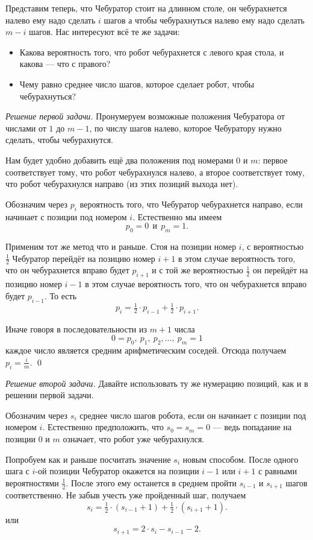 \documentclass{article}
\begin{document}
Представим теперь, что Чебуратор стоит на длинном столе,
он чебурахнется налево ему надо сделать $i$ шагов
а чтобы чебурахнуться налево ему надо сделать $m-i$ шагов.
Нас интересуют всё те же задачи:

\begin{itemize}
\item Какова вероятность того, что робот чебурахнется с левого края стола, и какова --- что с правого?
\item Чему равно среднее число шагов, которое сделает робот, чтобы чебурахнуться?
\end{itemize}

\medskip
\noindent\textit{Решение первой задачи.}
Пронумеруем возможные положения Чебуратора от числами от $1$ до $m-1$,
по числу шагов налево, которое Чебуратору нужно сделать, чтобы чебурахнутся.

Нам будет удобно добавить ещё два положения под номерами $0$ и $m$:
первое соответствует тому, что робот чебурахнулся налево, 
а второе соответствует тому, что робот чебурахнулся направо
(из этих позиций выхода нет).


Обозначим через $p_i$ вероятность того, 
что Чебуратор чебурахнется направо,
если начинает с позиции под номером $i$.
Естественно мы имеем 
\[p_0=0\ \  \text{и}\ \  p_{m}=1.\]

Применим тот же метод что и раньше.
Стоя на позиции номер $i$,
с вероятностью $\tfrac12$ Чебуратор перейдёт на позицию номер $i+1$
в этом случае вероятность того, 
что он чебурахнется вправо будет $p_{i+1}$
и с той же вероятностью $\tfrac12$ он перейдёт на позицию номер $i-1$
в этом случае вероятность того, что он чебурахнется вправо будет $p_{i-1}$.
То есть 
\[p_i=\tfrac12\cdot p_{i-1}+\tfrac12\cdot p_{i+1}.\]

Иначе говоря в последовательности из $m+1$ числа
\[0=p_0,\ p_1,\ p_2,\dots,\ p_{m}=1\] 
каждое число является средним арифметическим 
соседей.
Отсюда получаем $p_i=\tfrac im$.
\qed

\medskip
\noindent\textit{Решение второй задачи.}
Давайте использовать ту же нумерацию позиций, как и в решении первой задачи.

Обозначим через $s_i$ среднее число шагов робота, если он начинает с позиции под номером $i$.
Естественно предположить, что $s_0=s_{m}=0$ ---
ведь попадание на позиции $0$ и $m$ означает, что робот уже чебурахнулся.

Попробуем как и раньше посчитать значение $s_i$ новым способом.
После одного шага с $i$-ой позиции
Чебуратор окажется на позиции $i-1$ или $i+1$ с равными вероятностями $\tfrac12$.
После этого ему останется в среднем пройти $s_{i-1}$ и $s_{i+1}$ шагов соответственно. 
Не забыв учесть уже пройденный шаг,
получаем
\[s_i=\tfrac12\cdot(s_{i-1}+1)+\tfrac12\cdot(s_{i+1}+1).\]
или 
\[s_{i+1}=2\cdot s_i-s_{i-1}-2.\]
\end{document}
